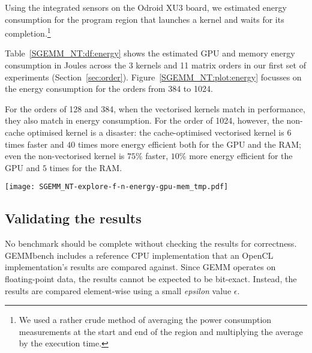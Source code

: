 \documentclass{acm_proc_article-sp} %
\begin{document}
Using the integrated sensors on the Odroid XU3 board, we estimated energy
consumption for the program region that launches a kernel and waits for its
completion.\footnote{We used a rather crude method of averaging the power
consumption measurements at the start and end of the region and multiplying the
average by the execution time.}

Table~\ref{SGEMM_NT:df:energy} shows the estimated GPU and memory energy
consumption in Joules across the 3 kernels and 11 matrix orders in our first
set of experiments (Section~\ref{sec:order}).
%
Figure~\ref{SGEMM_NT:plot:energy} focusses on the energy consumption for the
orders from 384 to 1024.

For the orders of 128 and 384, when the vectorised kernels match in
performance, they also match in energy consumption.
%
For the order of 1024, however, the non-cache optimised kernel is a disaster:
%
the cache-optimised vectorised kernel is $6$ times faster and $40$ times more
energy efficient both for the GPU and the RAM;
%
even the non-vectorised kernel is $75\%$ faster, $10\%$ more energy efficient
for the GPU and $5$ times for the RAM.

\begin{table*}
  \centering
  \caption{\label{SGEMM_NT:df:energy}The GPU \& memory energy consumption of 3 SGEMM NT kernels.}
  
\end{table*}

\begin{figure*}
  \texttt{[image: SGEMM\_NT-explore-f-n-energy-gpu-mem\_tmp.pdf]}
  \caption{The GPU \& memory energy consumption of 3 SGEMM NT kernels.}
  \label{SGEMM_NT:plot:energy}
\end{figure*}


\subsection{Validating the results}
\label{sec:validating}

No benchmark should be complete without checking the results for correctness.
%
GEMMbench includes a reference CPU implementation that an OpenCL
implementation's results are compared against.
%
Since GEMM operates on floating-point data, the results cannot be expected to be
bit-exact.
%
Instead, the results are compared element-wise using a small {\em epsilon}
value $\epsilon$.
\end{document}
